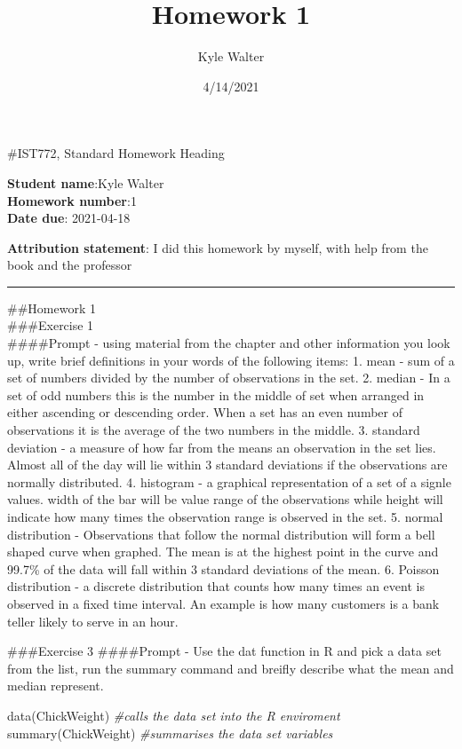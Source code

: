 \documentclass[
]{article}
\title{Homework 1}
\author{Kyle Walter}
\date{4/14/2021}
\newenvironment{Shaded}{\begin{snugshade}}{\end{snugshade}}
\newcommand{\CommentTok}[1]{\textcolor[rgb]{0.56,0.35,0.01}{\textit{#1}}}
\newcommand{\FunctionTok}[1]{\textcolor[rgb]{0.00,0.00,0.00}{#1}}
\newcommand{\NormalTok}[1]{#1}
\begin{document}
\maketitle

\#IST772, Standard Homework Heading

\textbf{Student name}:Kyle Walter\\
\textbf{Homework number}:1\\
\textbf{Date due}: 2021-04-18

\textbf{Attribution statement}: I did this homework by myself, with help
from the book and the professor

\begin{center}\rule{0.5\linewidth}{0.5pt}\end{center}

\#\#Homework 1\\
\#\#\#Exercise 1\\
\#\#\#\#Prompt - using material from the chapter and other information
you look up, write brief definitions in your words of the following
items: 1. mean - sum of a set of numbers divided by the number of
observations in the set. 2. median - In a set of odd numbers this is the
number in the middle of set when arranged in either ascending or
descending order. When a set has an even number of observations it is
the average of the two numbers in the middle. 3. standard deviation - a
measure of how far from the means an observation in the set lies. Almost
all of the day will lie within 3 standard deviations if the observations
are normally distributed. 4. histogram - a graphical representation of a
set of a signle values. width of the bar will be value range of the
observations while height will indicate how many times the observation
range is observed in the set. 5. normal distribution - Observations that
follow the normal distribution will form a bell shaped curve when
graphed. The mean is at the highest point in the curve and 99.7\% of the
data will fall within 3 standard deviations of the mean. 6. Poisson
distribution - a discrete distribution that counts how many times an
event is observed in a fixed time interval. An example is how many
customers is a bank teller likely to serve in an hour.

\#\#\#Exercise 3 \#\#\#\#Prompt - Use the dat function in R and pick a
data set from the list, run the summary command and breifly describe
what the mean and median represent.

\begin{Shaded}
\begin{Highlighting}[]
\FunctionTok{data}\NormalTok{(ChickWeight) }\CommentTok{\#calls the data set into the R enviroment}
\FunctionTok{summary}\NormalTok{(ChickWeight) }\CommentTok{\#summarises the data set variables}
\end{Highlighting}
\end{Shaded}
\end{document}
